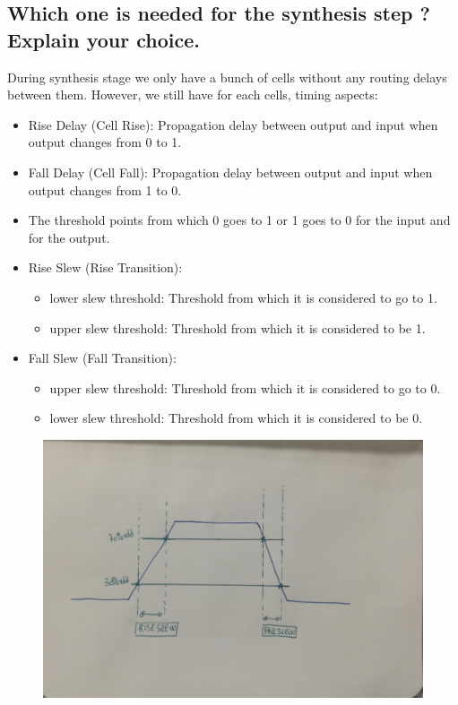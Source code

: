 \documentclass[11pt,a4paper,sans,dvipsnames]{report}
\begin{document}
	\subsection*{Which one is needed for the synthesis step ? Explain your choice.}
	During synthesis stage we only have a bunch of cells without any routing delays between them. However, we still have for each cells, timing aspects:



	\begin{itemize}
		\item Rise Delay (Cell Rise): Propagation delay between output and input when output changes from 0 to 1.
		\item Fall Delay (Cell Fall): Propagation delay between output and input when output changes from 1 to 0.
		\item The threshold points from which 0 goes to 1 or 1 goes to 0 for the input and for the output.
		\item Rise Slew (Rise Transition):
			\begin{itemize}
				\item lower slew threshold: Threshold from which it is considered to go to 1.
				\item upper slew threshold: Threshold from which it is considered to be 1.
			\end{itemize}
		\item Fall Slew (Fall Transition):
			\begin{itemize}
				\item upper slew threshold: Threshold from which it is considered to go to 0.
				\item lower slew threshold: Threshold from which it is considered to be 0.
			\end{itemize}
	\end{itemize}


	\begin{figure}[h!]
		\centering
		\includegraphics[width=.65\linewidth, frame]{images/slew.jpg}
		\label{fig:slew}
	\end{figure}%
\end{document}
